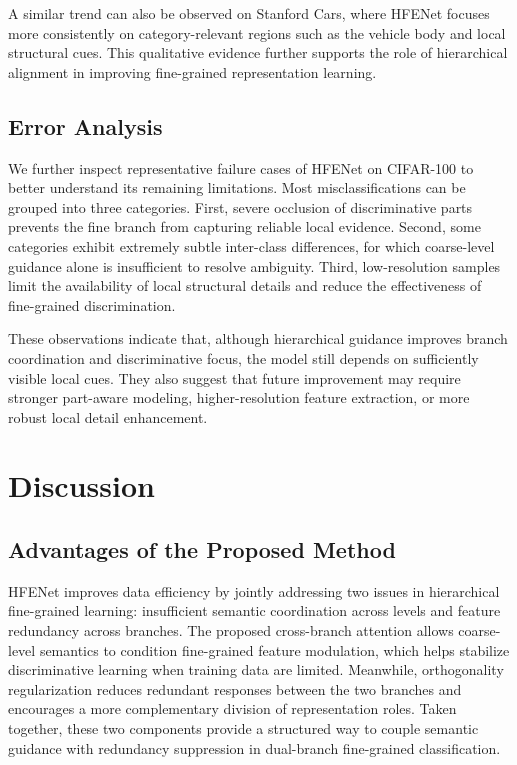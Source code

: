 \documentclass[pdflatex,sn-mathphys-num]{sn-jnl}
\theoremstyle{thmstyleone}%
\theoremstyle{thmstyletwo}%
\theoremstyle{thmstylethree}%
\begin{document}
A similar trend can also be observed on Stanford Cars, where HFENet focuses more consistently on category-relevant regions such as the vehicle body and local structural cues. 
This qualitative evidence further supports the role of hierarchical alignment in improving fine-grained representation learning.

\subsection{Error Analysis}

We further inspect representative failure cases of HFENet on CIFAR-100 to better understand its remaining limitations. 
Most misclassifications can be grouped into three categories. 
First, severe occlusion of discriminative parts prevents the fine branch from capturing reliable local evidence. 
Second, some categories exhibit extremely subtle inter-class differences, for which coarse-level guidance alone is insufficient to resolve ambiguity. 
Third, low-resolution samples limit the availability of local structural details and reduce the effectiveness of fine-grained discrimination.

These observations indicate that, although hierarchical guidance improves branch coordination and discriminative focus, the model still depends on sufficiently visible local cues. 
They also suggest that future improvement may require stronger part-aware modeling, higher-resolution feature extraction, or more robust local detail enhancement.

\section{Discussion}
\label{sec:discussion}

\subsection{Advantages of the Proposed Method}
HFENet improves data efficiency by jointly addressing two issues in hierarchical fine-grained learning: insufficient semantic coordination across levels and feature redundancy across branches. The proposed cross-branch attention allows coarse-level semantics to condition fine-grained feature modulation, which helps stabilize discriminative learning when training data are limited. Meanwhile, orthogonality regularization reduces redundant responses between the two branches and encourages a more complementary division of representation roles. Taken together, these two components provide a structured way to couple semantic guidance with redundancy suppression in dual-branch fine-grained classification.
\end{document}
